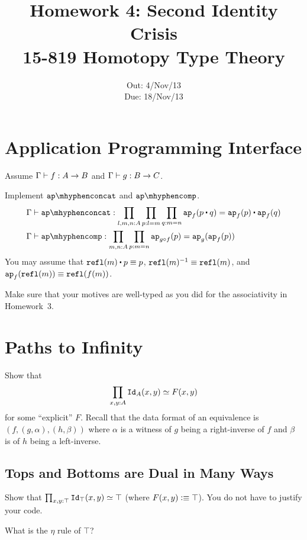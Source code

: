\documentclass[12pt]{article}
\title{\Large\textbf{
  Homework 4: Second Identity Crisis}
\normalsize\\
15-819 Homotopy Type Theory}
\author{}
\date{%
Out: 4/Nov/13\\
Due: 18/Nov/13
}
\begin{document}
\maketitle

\section{Application Programming Interface}

Assume
$\Gamma \vdash f : A \to B$ and
$\Gamma \vdash g : B \to C$.

\begin{task}
  Implement $\apconcat$ and $\apcomp$.
  \begin{align*}
    &\ctx \entails \apconcat : \prod_{l,m,n:A}\prod_{p:l=m}\prod_{q:m=n}\ap_f(p \concat q) = \ap_f(p) \concat \ap_f(q)
    \\
    &\ctx \entails \apcomp : \prod_{m,n:A}\prod_{p:m=n}\ap_{g \comp f}(p) = \ap_g(\ap_f(p))
  \end{align*}
  You may assume that $\refl(m) \concat p \jdeq p$, $\mathtt{refl}(m)^{-1} \equiv \mathtt{refl}(m)$,
  and $\mathtt{ap}_f(\mathtt{refl}(m)) \equiv \mathtt{refl}(f(m))$.
  \begin{hint}
    Make sure that your motives are well-typed
    as you did for the associativity in Homework~3.
  \end{hint}
\end{task}

\section{Paths to Infinity}

Show that
\[
  \prod_{x,y:A} \mathtt{Id}_A(x,y) \simeq F(x,y)
\]
for some ``explicit'' $F$.
Recall that the data format of an equivalence is
$(f,(g,\alpha),(h,\beta))$
where $\alpha$ is a witness of $g$ being a right-inverse of $f$
and $\beta$ is of $h$ being a left-inverse.

\subsection{Tops and Bottoms are Dual in Many Ways}

\begin{task}
  Show that $\prod_{x,y:\top} \mathtt{Id}_\top(x,y) \simeq \top$
  (where $F(x,y) \vcentcolon\equiv \top$).
  You do not have to justify your code.
  \begin{hint}
    What is the $\eta$ rule of $\top$?
  \end{hint}
\end{task}
\end{document}

